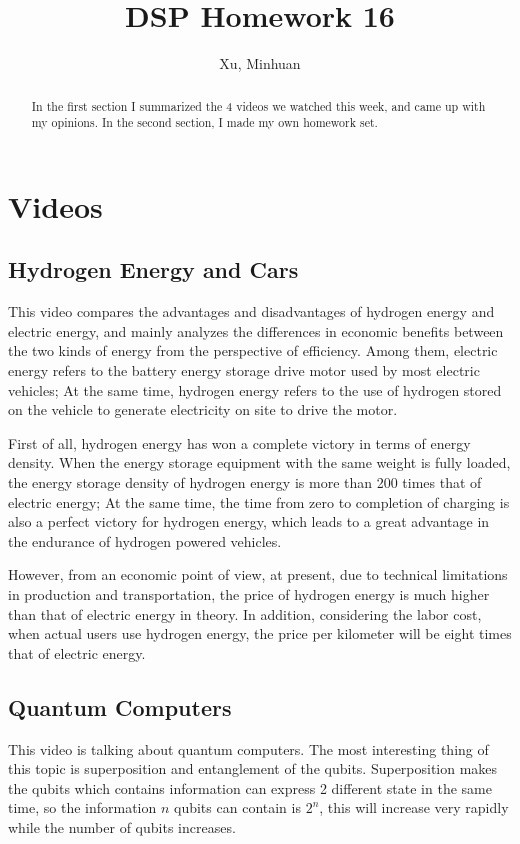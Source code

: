\documentclass{article}
\begin{document}
\title{DSP Homework 16}
\author{Xu, Minhuan}
\maketitle
\tableofcontents
\begin{abstract}
In the first section I summarized the 4 videos we watched this week, and came up with my opinions. In the second section, I made my own homework set.
\end{abstract}

\section{Videos}
\subsection{Hydrogen Energy and Cars}
This video compares the advantages and disadvantages of hydrogen energy and electric energy, and mainly analyzes the differences in economic benefits between the two kinds of energy from the perspective of efficiency. Among them, electric energy refers to the battery energy storage drive motor used by most electric vehicles; At the same time, hydrogen energy refers to the use of hydrogen stored on the vehicle to generate electricity on site to drive the motor.

First of all, hydrogen energy has won a complete victory in terms of energy density. When the energy storage equipment with the same weight is fully loaded, the energy storage density of hydrogen energy is more than 200 times that of electric energy; At the same time, the time from zero to completion of charging is also a perfect victory for hydrogen energy, which leads to a great advantage in the endurance of hydrogen powered vehicles.

However, from an economic point of view, at present, due to technical limitations in production and transportation, the price of hydrogen energy is much higher than that of electric energy in theory. In addition, considering the labor cost, when actual users use hydrogen energy, the price per kilometer will be eight times that of electric energy.
\subsection{Quantum Computers}
This video is talking about quantum computers. The most interesting thing of this topic is superposition and entanglement of the qubits. Superposition makes the qubits which contains information can express 2 different state in the same time, so the information $n$ qubits can contain is $2^n$, this will increase very rapidly while the number of qubits increases.
\end{document}

